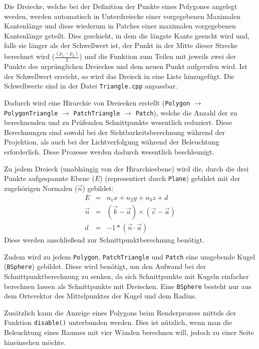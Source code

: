 \documentclass[final,a4paper,11pt,notitlepage,halfparskip]{scrreprt}
\begin{document}
Die Dreiecke, welche bei der Definition der Punkte eines Polygones angelegt
werden, werden automatisch in Unterdreiecke einer vorgegebenen Maximalen
Kantenlänge und diese wiederum in Patches einer maximalen vorgegebenen
Kantenlänge geteilt. Dies geschieht, in dem die längste Kante gesucht wird und,
falls sie länger als der Schwellwert ist, der Punkt in der Mitte dieser Strecke
berechnet wird ($\frac{(p_1 - p_2)}{2}$) und die Funktion zum Teilen mit jeweils zwei 
der Punkte des urprünglichen Dreieckes und dem neuen Punkt aufgerufen wird. 
Ist der Schwellwert erreicht, so wird das Dreieck in eine Liste hinzugefügt. 
Die Schwellwerte sind in der Datei \texttt{Triangle.cpp} anpassbar.

Dadurch wird eine Hirarchie von Dreiecken erstellt (\texttt{Polygon} 
$\rightarrow$ \texttt{PolygonTriangle} $\rightarrow$ \texttt{PatchTriangle} 
$\rightarrow$ \texttt{Patch}), welche die Anzahl der zu berechnenden und zu
Prüfenden Schnittpunkte wesentlich reduziert. Diese Berechnungen sind sowohl bei
der Sichtbarkeitsberechnung während der Projektion, als auch bei der
Lichtverfolgung während der Beleuchtung erforderlich. Diese Prozesse werden
dadurch wesentlich beschleunigt.

Zu jedem Dreieck (unabhängig von der Hirarchieebene) wird die, durch die drei
Punkte aufgespannte Ebene ($E$) (representiert durch \texttt{Plane}) gebildet 
mit der zugehörigen Normalen ($\vec{n}$) gebildet:
\begin{eqnarray*}
    E &=& n_1x + n_2y + n_3z + d\\
    \vec{n} &=& (\vec{b} - \vec{a}) \times (\vec{c} - \vec{a})\\
    d &=& -1 * (\vec{n} \cdot \vec{a})
\end{eqnarray*}
Diese werden anschließend zur Schnittpunktberechnung benötigt.

Zudem wird zu jedem \texttt{Polygon}, \texttt{PatchTriangle} und
\texttt{Patch} eine umgebende Kugel (\texttt{BSphere}) gebildet. Diese wird
benötigt, um den Aufwand bei der Schnittpunktberechnung zu senken, da sich
Schnittpunkte mit Kugeln einfacher berechnen lassen als Schnittpunkte mit
Dreiecken. Eine \texttt{BSphere} besteht nur aus dem Ortsvektor des
Mittelpunktes der Kugel und dem Radius.

Zusätzlich kann die Anzeige eines Polygons beim Renderprozess mittels der
Funktion \texttt{disable()} unterbunden werden. Dies ist nützlich, wenn man die
Beleuchtung eines Raumes mit vier Wänden berechnen will, jedoch zu einer Seite
hineinsehen möchte.
\end{document}

